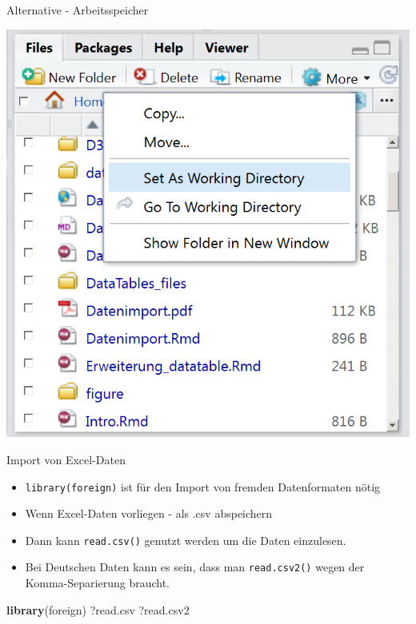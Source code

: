 \documentclass[ignorenonframetext,]{beamer}
\newenvironment{Shaded}{}{}
\newcommand{\KeywordTok}[1]{\textcolor[rgb]{0.00,0.44,0.13}{\textbf{{#1}}}}
\newcommand{\NormalTok}[1]{{#1}}
\providecommand{\tightlist}{%
\setlength{\itemsep}{0pt}\setlength{\parskip}{0pt}}
\begin{document}
\begin{frame}{Alternative - Arbeitsspeicher}

\includegraphics{./tex2pdf.956/f4ebbc3c67143aca8b1f90ded80bc3bfc7e2d639.png}

\end{frame}

\begin{frame}[fragile]{Import von Excel-Daten}

\begin{itemize}
\tightlist
\item
  \texttt{library(foreign)} ist für den Import von fremden Datenformaten
  nötig
\item
  Wenn Excel-Daten vorliegen - als .csv abspeichern
\item
  Dann kann \texttt{read.csv()} genutzt werden um die Daten einzulesen.
\item
  Bei Deutschen Daten kann es sein, dass man \texttt{read.csv2()} wegen
  der Komma-Separierung braucht.
\end{itemize}

\begin{Shaded}
\begin{Highlighting}[]
\KeywordTok{library}\NormalTok{(foreign)}
\NormalTok{?read.csv}
\NormalTok{?read.csv2}
\end{Highlighting}
\end{Shaded}

\end{frame}
\end{document}
